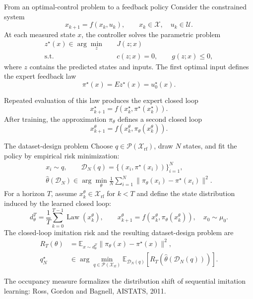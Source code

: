 \documentclass[aspectratio=169,10pt]{beamer}
\newcommand{\Xr}{\mathcal{X}_{\mathrm{rf}}}
\newcommand{\D}{\mathcal{D}}
\newcommand{\smallsource}[1]{\vfill\begin{flushleft}\color{Slate}\tiny #1\end{flushleft}}
\begin{document}
\begin{frame}{From an optimal-control problem to a feedback policy}
Consider the constrained system
\[
  x_{k+1}=f(x_k,u_k),\qquad x_k\in\mathcal X,\quad u_k\in\mathcal U.
\]
At each measured state $x$, the controller solves the parametric problem
\begin{align*}
  z^\star(x)\in\arg\min_z\quad & J(z;x) \\
  \text{s.t.}\quad & c(z;x)=0, \qquad g(z;x)\le 0,
\end{align*}
where $z$ contains the predicted states and inputs. The first optimal input defines the expert feedback law
\[
  \pi^\star(x)=E z^\star(x)=u_0^\star(x).
\]

Repeated evaluation of this law produces the expert closed loop
\[
  x_{k+1}^\star=f\!\left(x_k^\star,\pi^\star(x_k^\star)\right).
\]
After training, the approximation $\pi_\theta$ defines a second closed loop
\[
  x_{k+1}^\theta=f\!\left(x_k^\theta,\pi_\theta(x_k^\theta)\right).
\]
\end{frame}

\begin{frame}{The dataset-design problem}
\small
Choose $q\in\mathcal P(\Xr)$, draw $N$ states, and fit the policy by empirical risk minimization:
\[
\begin{gathered}
  x_i\sim q,\qquad \D_N(q)=\{(x_i,\pi^\star(x_i))\}_{i=1}^{N},\\[0.25em]
  \widehat\theta(\D_N)
  \in\arg\min_\theta\frac1N\sum_{i=1}^{N}
  \|\pi_\theta(x_i)-\pi^\star(x_i)\|^2.
\end{gathered}
\]
For a horizon $T$, assume $x_k^\theta\in\Xr$ for $k<T$ and define the state distribution induced by the learned closed loop:
\[
  d_\theta^T=\frac1T\sum_{k=0}^{T-1}\operatorname{Law}(x_k^\theta),
  \qquad x_{k+1}^\theta=f(x_k^\theta,\pi_\theta(x_k^\theta)),\quad x_0\sim\mu_0.
\]
The closed-loop imitation risk and the resulting dataset-design problem are
\[
\begin{aligned}
  R_T(\theta)&=\mathbb E_{x\sim d_\theta^T}
  \|\pi_\theta(x)-\pi^\star(x)\|^2,\\[0.35em]
  q_N^\star&\in\arg\min_{q\in\mathcal P(\Xr)}
  \mathbb E_{\D_N(q)}\!\left[R_T\!\left(\widehat\theta(\D_N(q))\right)\right].
\end{aligned}
\]
\smallsource{The occupancy measure formalizes the distribution shift of sequential imitation learning: Ross, Gordon and Bagnell, AISTATS, 2011.}
\end{frame}
\end{document}
